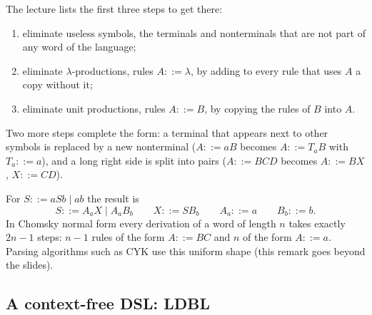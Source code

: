 The lecture lists the first three steps to get there:
\begin{enumerate}
  \item eliminate useless symbols, the terminals and nonterminals that are not
    part of any word of the language;
  \item eliminate $\lambda$-productions, rules $A ::= \lambda$, by adding to every
    rule that uses $A$ a copy without it;
  \item eliminate unit productions, rules $A ::= B$, by copying the rules of $B$
    into $A$.
\end{enumerate}
Two more steps complete the form: a terminal that appears next to other
symbols is replaced by a new nonterminal ($A ::= aB$ becomes $A ::= T_a B$
with $T_a ::= a$), and a long right side is split into pairs ($A ::= BCD$
becomes $A ::= BX$, $X ::= CD$).

For $S ::= aSb \mid ab$ the result is
\[
S ::= A_a X \mid A_a B_b \qquad X ::= S B_b \qquad A_a ::= a \qquad B_b ::= b.
\]
In Chomsky normal form every derivation of a word of length $n$ takes exactly
$2n - 1$ steps: $n - 1$ rules of the form $A ::= BC$ and $n$ of the form
$A ::= a$. Parsing algorithms such as CYK use this uniform shape (this
remark goes beyond the slides).

\subsection{A context-free DSL: LDBL}

